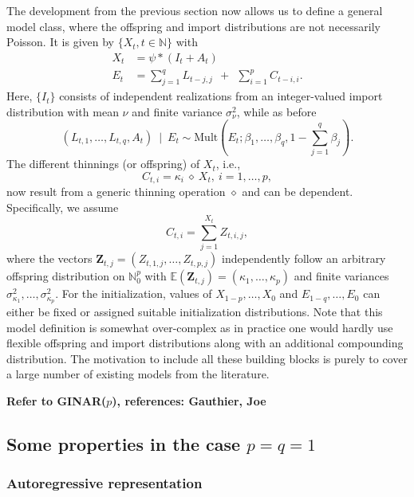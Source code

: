 \documentclass{article}
\begin{document}
The development from the previous section now allows us to define a general model class, where the offspring and import distributions are not necessarily Poisson. It is given by  $\{X_t, t \in \mathbb{N}\}$ with
\begin{align}
X_t & = \psi * (I_t + A_t)\label{eq:X_general}\\
E_t & = \sum_{j = 1}^q L_{t - j, j} \ \ + \ \ \sum_{i = 1}^p C_{t - i, i}.\label{eq:E_general}
\end{align}
Here, $\{I_t\}$ consists of independent realizations from an integer-valued import distribution with mean $\nu$ and finite variance $\sigma^2_\nu$, while as before
$$
(L_{t, 1}, \dots, L_{t, q}, A_t) \ \mid \ E_t \sim \text{Mult}\left(E_t; \beta_1, \dots, \beta_q, 1 - \sum_{j = 1}^q \beta_j\right).
$$
The different thinnings (or offspring) of $X_t$, i.e.,
$$
C_{t, i} = \kappa_i \ \diamond \ X_t, \ i = 1, \dots, p,
$$
now result from a generic thinning operation $\diamond$ and can be dependent. Specifically, we assume
$$
C_{t, i} = \sum_{j = 1}^{X_t} Z_{t, i, j},
$$
where the vectors $\mathbf{Z}_{t, j} = (Z_{t, 1, j}, \dots, Z_{t, p, j})$ independently follow an arbitrary offspring distribution on $\mathbb{N}_0^p$ with $\mathbb{E}(\mathbf{Z}_{t, j}) = (\kappa_1, \dots, \kappa_p)$ and finite variances $\sigma^2_{\kappa_1}, \dots, \sigma^2_{\kappa_p}$. For the initialization, values of $X_{1 - p}, \dots, X_0$ and $E_{1 - q}, \dots, E_0$ can either be fixed or assigned suitable initialization distributions. %
Note that this model definition is somewhat over-complex as in practice one would hardly use flexible offspring and import distributions along with an additional compounding distribution. The motivation to include all these building blocks is purely to cover a large number of existing models from the literature.

\textbf{Refer to GINAR($p$), references: Gauthier, Joe}

\subsection{Some properties in the case $p = q = 1$}
\label{eq:stochastic_properties_general}

\subsubsection{Autoregressive representation}
\label{subsubsec:AR}
\end{document}

